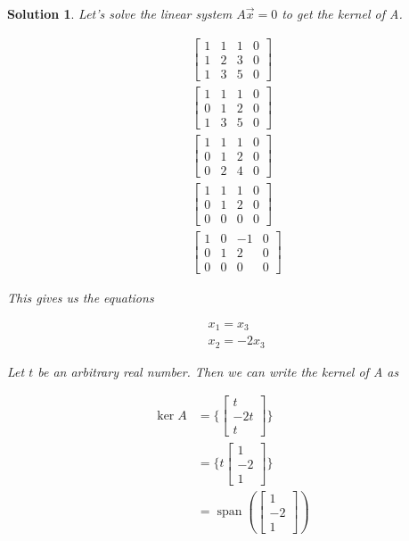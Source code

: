 \documentclass{article}
\newtheorem*{solution}{Solution}
\DeclareMathOperator{\Span}{span}
\begin{document}
\begin{solution}
Let's solve the linear system $A\vec{x} = 0$ to get the kernel of A.

\begin{align*}
& \left[ \begin{array}{ccc|c}1 & 1 & 1 & 0 \\ 1 & 2 & 3 & 0 \\ 1 & 3 & 5 & 0 \end{array} \right] \\
& \left[ \begin{array}{ccc|c}1 & 1 & 1 & 0 \\ 0 & 1 & 2 & 0 \\ 1 & 3 & 5 & 0 \end{array} \right] \\
& \left[ \begin{array}{ccc|c}1 & 1 & 1 & 0 \\ 0 & 1 & 2 & 0 \\ 0 & 2 & 4 & 0 \end{array} \right] \\
& \left[ \begin{array}{ccc|c}1 & 1 & 1 & 0 \\ 0 & 1 & 2 & 0 \\ 0 & 0 & 0 & 0 \end{array} \right] \\
& \left[ \begin{array}{ccc|c}1 & 0 & -1 & 0 \\ 0 & 1 & 2 & 0 \\ 0 & 0 & 0 & 0 \end{array} \right]
\end{align*}

This gives us the equations 

\begin{align*}
& x_{1} = x_{3} \\
& x_{2} = -2x_{3}
\end{align*}

Let $t$ be an arbitrary real number. Then we can write the kernel of A as

\begin{align*}
\ker A &= \Bigg\{ \begin{bmatrix} t \\ -2t \\ t \end{bmatrix} \Bigg\} \\
&= \Bigg\{ t \begin{bmatrix} 1 \\ -2 \\ 1 \end{bmatrix} \Bigg\} \\
&= \Span \left( \begin{bmatrix} 1 \\ -2 \\ 1 \end{bmatrix} \right)
\end{align*}


\end{solution}
\end{document}
